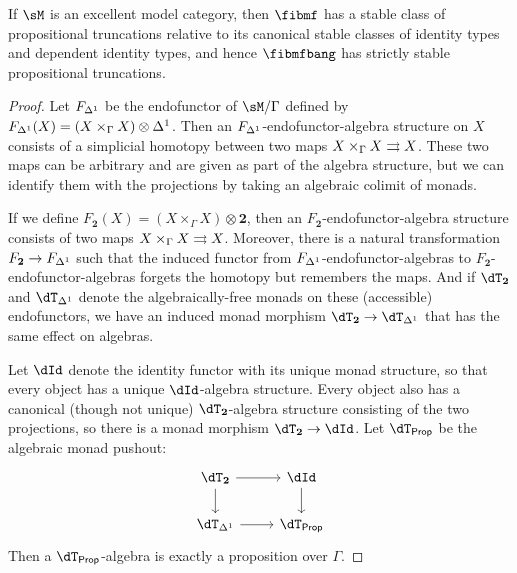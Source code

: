 \documentclass{amsart}
\def\dtprop{\dT_{\mathsf{Prop}}}
\def\tr{\mathsf{tr}}
\def\treq{\mathsf{treq}}
\begin{document}
\begin{thm}
  If $\sM$ is an excellent model category, then $\fibmf$ has a stable class of propositional truncations relative to its canonical stable classes of identity types and dependent identity types, and hence $\fibmfbang$ has strictly stable propositional truncations.
\end{thm}
\begin{proof}
  Let $F_{{\Delta^1}}$ be the endofunctor of $\sM/\Gamma$ defined by $F_{{\Delta^1}}(X) = (X \times_\Gamma X) \otimes {\Delta^1}$.
  Then an $F_{{\Delta^1}}$-endofunctor-algebra structure on $X$ consists of a simplicial homotopy between two maps $X \times_\Gamma X \rightrightarrows X$.
  These two maps can be arbitrary and are given as part of the algebra structure, but we can identify them with the projections by taking an algebraic colimit of monads.

  If we define $F_{\mathbf{2}}(X) = (X\times_\Gamma X) \otimes \mathbf{2}$, then an $F_{\mathbf{2}}$-endofunctor-algebra structure consists of two maps $X \times_\Gamma X \rightrightarrows X$.
  Moreover, there is a natural transformation $F_{\mathbf{2}} \to F_{\Delta^1}$ such that the induced functor from $F_{{\Delta^1}}$-endofunctor-algebras to $F_{\mathbf{2}}$-endofunctor-algebras forgets the homotopy but remembers the maps.
  And if $\dT_{\mathbf{2}}$ and $\dT_\ivl$ denote the algebraically-free monads on these (accessible) endofunctors, we have an induced monad morphism $\dT_{\mathbf{2}} \to \dT_\ivl$ that has the same effect on algebras.

  Let $\dId$ denote the identity functor with its unique monad structure, so that every object has a unique $\dId$-algebra structure.
  Every object also has a canonical (though not unique) $\dT_{\mathbf{2}}$-algebra structure consisting of the two projections, so there is a monad morphism $\dT_{\mathbf{2}} \to \dId$.
  Let $\dtprop$ be the algebraic monad pushout:
  \[
  \begin{tikzcd}
    \dT_{\mathbf{2}} \ar[r] \ar[d] & \dId \ar[d] \\ \dT_{\ivl} \ar[r] & \dtprop
  \end{tikzcd}
  \]
  Then a $\dtprop$-algebra is exactly a proposition over $\Gamma$.


\end{proof}
\end{document}
